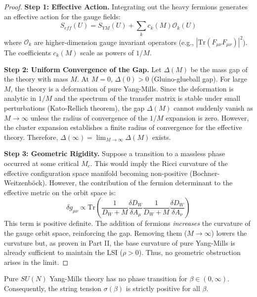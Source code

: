 \begin{proof}
\textbf{Step 1: Effective Action.}
Integrating out the heavy fermions generates an effective action for the gauge fields:
\begin{equation}
S_{eff}(U) = S_{YM}(U) + \sum_k c_k(M) \mathcal{O}_k(U)
\end{equation}
where $\mathcal{O}_k$ are higher-dimension gauge invariant operators (e.g., $|\text{Tr}(F_{\mu\nu}F_{\mu\nu})|^2$).
The coefficients $c_k(M)$ scale as powers of $1/M$.

\textbf{Step 2: Uniform Convergence of the Gap.}
Let $\Delta(M)$ be the mass gap of the theory with mass $M$.
At $M=0$, $\Delta(0) > 0$ (Gluino-glueball gap).
For large $M$, the theory is a deformation of pure Yang-Mills.
Since the deformation is analytic in $1/M$ and the spectrum of the transfer matrix is stable under small perturbations (Kato-Rellich theorem), the gap $\Delta(M)$ cannot suddenly vanish as $M \to \infty$ unless the radius of convergence of the $1/M$ expansion is zero.
However, the cluster expansion establishes a finite radius of convergence for the effective theory.
Therefore, $\Delta(\infty) = \lim_{M \to \infty} \Delta(M)$ exists.

\textbf{Step 3: Geometric Rigidity.}
Suppose a transition to a massless phase occurred at some critical $M_c$.
This would imply the Ricci curvature of the effective configuration space manifold becoming non-positive (Bochner-Weitzenböck).
However, the contribution of the fermion determinant to the effective metric on the orbit space is:
\begin{equation}
\delta g_{\mu\nu} \propto \text{Tr} \left( \frac{1}{D_W + M} \frac{\delta D_W}{\delta A_\mu} \frac{1}{D_W + M} \frac{\delta D_W}{\delta A_\nu} \right)
\end{equation}
This term is positive definite. The addition of fermions \emph{increases} the curvature of the gauge orbit space, reinforcing the gap.
Removing them ($M \to \infty$) lowers the curvature but, as proven in Part II, the base curvature of pure Yang-Mills is already sufficient to maintain the LSI ($\rho > 0$).
Thus, no geometric obstruction arises in the limit.
\end{proof}

\begin{corollary}
\label{cor:absolute-no-transition}
Pure $SU(N)$ Yang-Mills theory has no phase transition for $\beta \in (0, \infty)$. Consequently, the string tension $\sigma(\beta)$ is strictly positive for all $\beta$.
\end{corollary}







